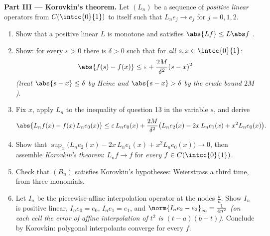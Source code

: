 \begin{problem}
\medskip
\noindent\textbf{Part III --- Korovkin's theorem.} Let $(L_n)$
be a sequence of \emph{positive linear} operators from
$C(\intcc{0}{1})$ to itself such that $L_ne_j \to e_j$
 for $j = 0, 1, 2$.
\begin{enumerate}[resume]
  \item Show that a positive linear $L$ is monotone and
        satisfies $\abs{Lf} \leq L\abs f$ .
  \item Show: for every $\varepsilon > 0$ there is $\delta > 0$
        such that for \emph{all} $s, x \in \intcc{0}{1}$:
        \[
        \abs{f(s) - f(x)} \leq \varepsilon +
        \frac{2M}{\delta^2}(s - x)^2
        \]
        \emph{(treat $\abs{s - x} \leq \delta$ by Heine and
        $\abs{s-x} > \delta$ by the crude bound $2M$)}.
  \item Fix $x$, apply $L_n$ to the inequality of question 13
        in the variable $s$, and derive
        \[
        \abs{L_nf(x) - f(x)\,L_ne_0(x)}
        \leq \varepsilon\,L_ne_0(x) + \frac{2M}{\delta^2}
        \bigl(L_ne_2(x) - 2x\,L_ne_1(x) + x^2 L_ne_0(x)\bigr).
        \]
  \item Show that $\sup_x \bigl(L_ne_2(x) - 2x\,L_ne_1(x) + x^2
        L_ne_0(x)\bigr) \to 0$, then assemble
        \emph{Korovkin's theorem}: $L_nf \to f$  for
        \emph{every} $f \in C(\intcc{0}{1})$.
  \item Check that $(B_n)$ satisfies Korovkin's hypotheses:
        Weierstrass a third time, from three monomials.
  \item Let $I_n$ be the piecewise-affine interpolation
        operator at the nodes $\frac kn$. Show $I_n$ is
        positive linear, $I_ne_0 = e_0$, $I_ne_1 = e_1$, and
        $\norm{I_ne_2 - e_2}_\infty = \frac{1}{4n^2}$
        \emph{(on each cell the error of affine interpolation
        of $t^2$ is $(t - a)(b - t)$)}. Conclude by Korovkin:
        polygonal interpolants converge  for every
         $f$.
\end{enumerate}


\end{problem}
